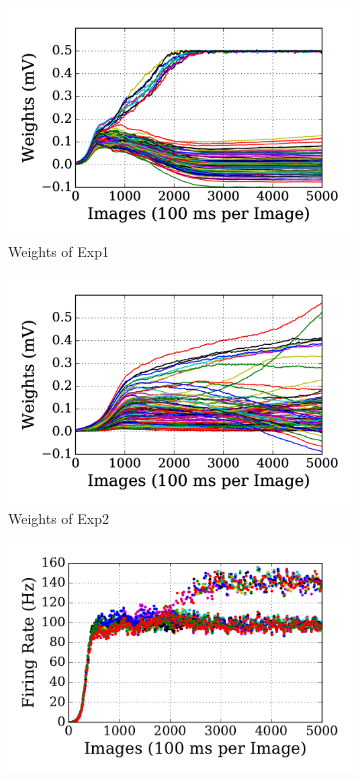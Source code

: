 \begin{figure}
	\centering
	\begin{subfigure}[t]{0.45\textwidth}
		\includegraphics[width=\textwidth]{pics_sdlm/10_exp_SRBM_Orig/exp1_weights_s.png}
		\caption{Weights of Exp1}
	\end{subfigure}
	\begin{subfigure}[t]{0.45\textwidth}
		\includegraphics[width=\textwidth]{pics_sdlm/10_exp_SRBM_Orig/exp2_weights_s.png}
		\caption{Weights of Exp2}
	\end{subfigure}
	\begin{subfigure}[t]{0.45\textwidth}
		\includegraphics[width=\textwidth]{pics_sdlm/10_exp_SRBM_Orig/exp1_recon_s.pdf}

\end{subfigure}
\end{figure}
